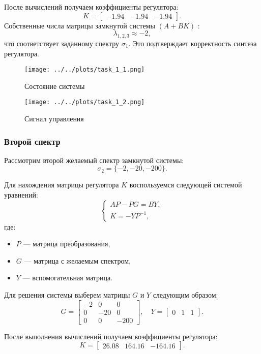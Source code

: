 После вычислений получаем коэффициенты регулятора:
\[
K = \begin{bmatrix}
-1.94 & -1.94 & -1.94
\end{bmatrix}.
\]
\newpage
Собственные числа матрицы замкнутой системы $(A + BK)$ :
\[
\lambda_{1,2,3} \approx -2,
\]
что соответствует заданному спектру $\sigma_1$. Это подтверждает корректность синтеза регулятора.

\begin{figure}[H]
    \centering
    \texttt{[image: ../../plots/task\_1\_1.png]}
    \caption{Состояние системы}
    \label{fig:task_1_state_system_1}
\end{figure}

\begin{figure}[H]
    \centering
    \texttt{[image: ../../plots/task\_1\_2.png]}
    \caption{Сигнал управления}
    \label{fig:task_1_control_signal_1}
\end{figure}

\subsubsection{Второй спектр}

Рассмотрим второй желаемый спектр замкнутой системы:
\[
\sigma_2 = \{-2, -20, -200\}.
\]

Для нахождения матрицы регулятора $K$ воспользуемся следующей системой уравнений:
\[
\begin{cases}
AP - PG = BY, \\
K = -Y P^{-1},
\end{cases}
\]
где:
\begin{itemize}
    \item $P$ — матрица преобразования,
    \item $G$ — матрица с желаемым спектром,
    \item $Y$ — вспомогательная матрица.
\end{itemize}

Для решения системы выберем матрицы $G$ и $Y$ следующим образом:
\[
G = \begin{bmatrix}
-2 & 0 & 0 \\
0 & -20 & 0 \\
0 & 0 & -200
\end{bmatrix}, \quad
Y = \begin{bmatrix}
0 & 1 & 1
\end{bmatrix}.
\]

После выполнения вычислений получаем коэффициенты регулятора:
\[
K = \begin{bmatrix}
26.08 & 164.16 & -164.16
\end{bmatrix}.
\]

